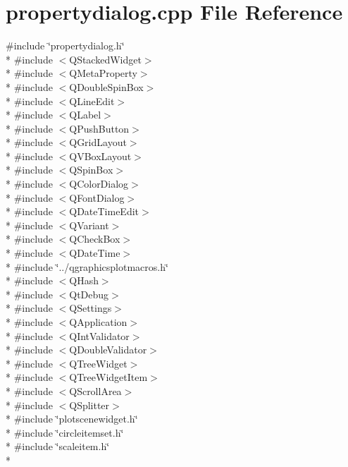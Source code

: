 \section{propertydialog.\+cpp File Reference}
\label{bk3_2properties_2propertydialog_8cpp}
{\ttfamily \#include \char`\"{}propertydialog.\+h\char`\"{}}\\*
{\ttfamily \#include $<$Q\+Stacked\+Widget$>$}\\*
{\ttfamily \#include $<$Q\+Meta\+Property$>$}\\*
{\ttfamily \#include $<$Q\+Double\+Spin\+Box$>$}\\*
{\ttfamily \#include $<$Q\+Line\+Edit$>$}\\*
{\ttfamily \#include $<$Q\+Label$>$}\\*
{\ttfamily \#include $<$Q\+Push\+Button$>$}\\*
{\ttfamily \#include $<$Q\+Grid\+Layout$>$}\\*
{\ttfamily \#include $<$Q\+V\+Box\+Layout$>$}\\*
{\ttfamily \#include $<$Q\+Spin\+Box$>$}\\*
{\ttfamily \#include $<$Q\+Color\+Dialog$>$}\\*
{\ttfamily \#include $<$Q\+Font\+Dialog$>$}\\*
{\ttfamily \#include $<$Q\+Date\+Time\+Edit$>$}\\*
{\ttfamily \#include $<$Q\+Variant$>$}\\*
{\ttfamily \#include $<$Q\+Check\+Box$>$}\\*
{\ttfamily \#include $<$Q\+Date\+Time$>$}\\*
{\ttfamily \#include \char`\"{}../qgraphicsplotmacros.\+h\char`\"{}}\\*
{\ttfamily \#include $<$Q\+Hash$>$}\\*
{\ttfamily \#include $<$Qt\+Debug$>$}\\*
{\ttfamily \#include $<$Q\+Settings$>$}\\*
{\ttfamily \#include $<$Q\+Application$>$}\\*
{\ttfamily \#include $<$Q\+Int\+Validator$>$}\\*
{\ttfamily \#include $<$Q\+Double\+Validator$>$}\\*
{\ttfamily \#include $<$Q\+Tree\+Widget$>$}\\*
{\ttfamily \#include $<$Q\+Tree\+Widget\+Item$>$}\\*
{\ttfamily \#include $<$Q\+Scroll\+Area$>$}\\*
{\ttfamily \#include $<$Q\+Splitter$>$}\\*
{\ttfamily \#include \char`\"{}plotscenewidget.\+h\char`\"{}}\\*
{\ttfamily \#include \char`\"{}circleitemset.\+h\char`\"{}}\\*
{\ttfamily \#include \char`\"{}scaleitem.\+h\char`\"{}}\\*

